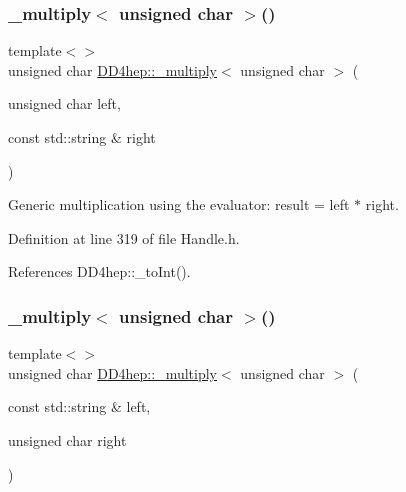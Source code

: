 \subsubsection{\texorpdfstring{\+\_\+multiply$<$ unsigned char $>$()}{\_multiply< unsigned char >()}\hspace{0.1cm}{\footnotesize\ttfamily [2/3]}}
{\footnotesize\ttfamily template$<$$>$ \\
unsigned char \hyperlink{group___d_d4_h_e_p___g_e_o_m_e_t_r_y_gab860c2299e2eb50e537c5079fb0c9c51}{D\+D4hep\+::\+\_\+multiply}$<$ unsigned char $>$ (\begin{DoxyParamCaption}\item[{unsigned char}]{left,  }\item[{const std\+::string \&}]{right }\end{DoxyParamCaption})\hspace{0.3cm}{\ttfamily [inline]}}



Generic multiplication using the evaluator\+: result = left $\ast$ right. 



Definition at line 319 of file Handle.\+h.



References D\+D4hep\+::\+\_\+to\+Int().

\hypertarget{group___d_d4_h_e_p___g_e_o_m_e_t_r_y_ga1d1e355d021670241d0fb9a437cabfc4}{}\label{group___d_d4_h_e_p___g_e_o_m_e_t_r_y_ga1d1e355d021670241d0fb9a437cabfc4} 
\subsubsection{\texorpdfstring{\+\_\+multiply$<$ unsigned char $>$()}{\_multiply< unsigned char >()}\hspace{0.1cm}{\footnotesize\ttfamily [3/3]}}
{\footnotesize\ttfamily template$<$$>$ \\
unsigned char \hyperlink{group___d_d4_h_e_p___g_e_o_m_e_t_r_y_gab860c2299e2eb50e537c5079fb0c9c51}{D\+D4hep\+::\+\_\+multiply}$<$ unsigned char $>$ (\begin{DoxyParamCaption}\item[{const std\+::string \&}]{left,  }\item[{unsigned char}]{right }\end{DoxyParamCaption})\hspace{0.3cm}{\ttfamily [inline]}}



